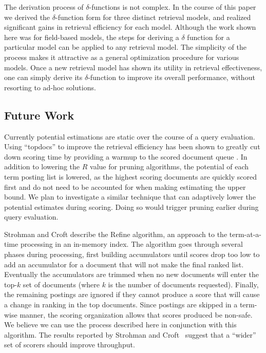 \documentclass{sig-alternate}
\begin{document}
The derivation process of $\delta$-functions is not complex. In the course of this paper we derived the $\delta$-function form for three distinct retrieval models, and realized significant gains in retrieval efficiency for each model. Although the work shown here was for field-based models, the steps for deriving a $\delta$ function for a particular model can be applied to any retrieval model. The simplicity of the process makes it attractive as a general optimization procedure for various models. Once a new retrieval model has shown its utility in retrieval effectiveness, one can simply derive its $\delta$-function to improve its overall performance, without resorting to ad-hoc solutions. 

\subsection{Future Work}
Currently potential estimations are static over the course of a query evaluation. Using ``topdocs'' to improve the retrieval efficiency has been shown to greatly cut down scoring time by providing a warmup to the scored document queue \cite{brown-topdocs, strohman-topdocs}. In addition to lowering the $R$ value for pruning algorithms, the potential of each term posting list is lowered, as the highest scoring documents are quickly scored first and do not need to be accounted for when making estimating the upper bound. We plan to investigate a similar technique that can adaptively lower the potential estimates during scoring. Doing so would trigger pruning earlier during query evaluation.

Strohman and Croft \cite{strohman-sigir-2007} describe the Refine algorithm, an approach to the term-at-a-time processing in
an in-memory index. The algorithm goes through several phases during processing, first building accumulators until scores drop too low to add an accumulator for a document that will not make the final ranked list. Eventually the accumulators are trimmed when no new documents will enter the top-$k$ set of documents (where $k$ is the number of documents requested). Finally, the remaining postings are ignored if they cannot produce a score that will cause a change in ranking in the top documents.
Since postings are skipped in a term-wise manner, the scoring organization allows that scores produced be non-safe. We believe we can use the process described here in conjunction with this algorithm. The results reported by Strohman and Croft~\cite{strohman-sigir-2007} suggest that a ``wider'' set of scorers should improve throughput. 
\end{document}

